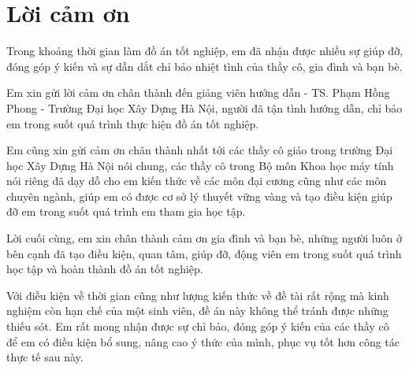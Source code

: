 \chapter*{\centering Lời cảm ơn}

Trong khoảng thời gian làm đồ án tốt nghiệp, em đã nhận được nhiều sự giúp đỡ, đóng góp ý kiến và sự dẫn dắt chỉ bảo nhiệt tình của thầy cô, gia đình và bạn bè.

Em xin gửi lời cảm ơn chân thành đến giảng viên hướng dẫn - TS. Phạm Hồng Phong - Trường Đại học Xây Dựng Hà Nội, người đã tận tình hướng dẫn, chỉ bảo em trong suốt quá trình thực hiện đồ án tốt nghiệp. 

Em cũng xin gửi cảm ơn chân thành nhất tới các thầy cô giáo trong trường Đại học Xây Dựng Hà Nội nói chung, các thầy cô trong Bộ môn Khoa học máy tính nói riêng đã dạy dỗ cho em kiến thức về các môn đại cương cũng như các môn chuyên ngành, giúp em có được cơ sở lý thuyết vững vàng và tạo điều kiện giúp đỡ em trong suốt quá trình em tham gia học tập. 

Lời cuối cùng, em xin chân thành cảm ơn gia đình và bạn bè, những người luôn ở bên cạnh đã tạo điều kiện, quan tâm, giúp đỡ, động viên em trong suốt quá trình học tập và hoàn thành đồ án tốt nghiệp. 

Với điều kiện về thời gian cũng như lượng kiến thức về đề tài rất rộng mà kinh nghiệm còn hạn chế của một sinh viên, đề án này không thể tránh được những thiếu sót. Em rất mong nhận được sự chỉ bảo, đóng góp ý kiến của các thầy cô để em có điều kiện bổ sung, nâng cao ý thức của mình, phục vụ tốt hơn công tác thực tế sau này.
